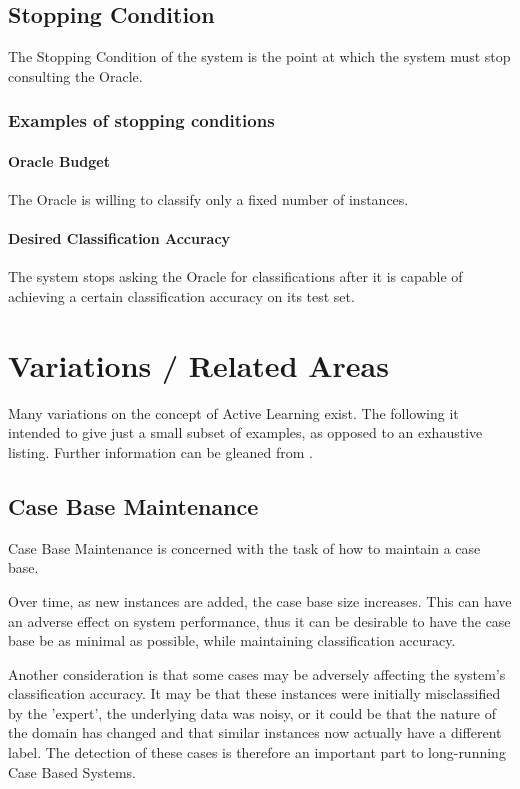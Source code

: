 \documentclass[a4paper,11pt]{report}
\begin{document}
\subsection{Stopping Condition}
The Stopping Condition of the system is the point at which the system must stop consulting the Oracle.

\subsubsection{Examples of stopping conditions}
\paragraph{Oracle Budget} 
The Oracle is willing to classify only a fixed number of instances.

\paragraph{Desired Classification Accuracy} 
The system stops asking the Oracle for classifications after it is capable of achieving a certain classification accuracy on its test set.

\section{Variations / Related Areas}
Many variations on the concept of Active Learning exist. The following it intended to give just a small subset of examples, as opposed to an exhaustive listing. Further information can be gleaned from \citep{Settles2010}.

\subsection{Case Base Maintenance}
Case Base Maintenance is concerned with the task of how to maintain a case base. 

Over time, as new instances are added, the case base size increases. This can have an adverse effect on system performance, thus it can be desirable to have the case base be as minimal as possible, while maintaining classification accuracy.

Another consideration is that some cases may be adversely affecting the system's classification accuracy. It may be that these instances were initially misclassified by the 'expert', the underlying data was noisy, or it could be that the nature of the domain has changed and that similar instances now actually have a different label. The detection of these cases is therefore an important part to long-running Case Based Systems.
\end{document}
